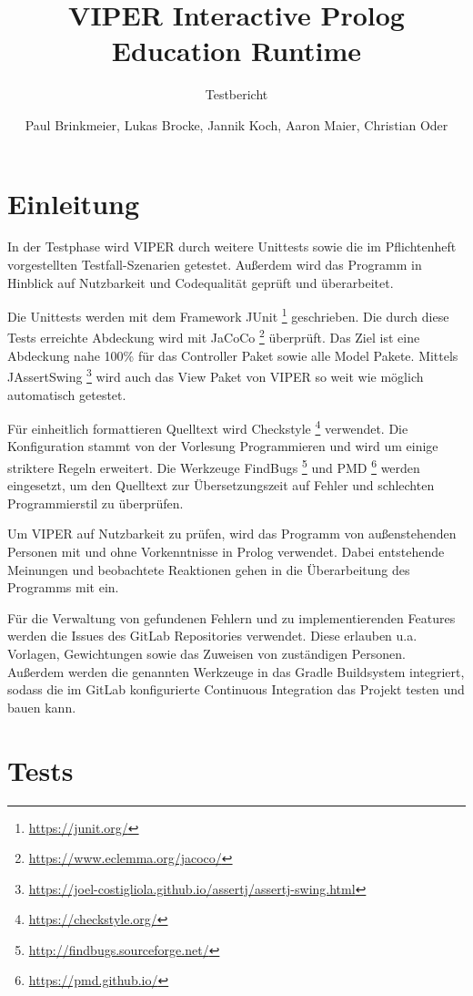 \documentclass[parskip=full,11pt,twoside]{scrartcl}
\title{VIPER Interactive Prolog Education Runtime}
\subtitle{Testbericht}
\author{Paul Brinkmeier, Lukas Brocke, Jannik Koch, Aaron Maier, Christian Oder}
\date{}
\begin{document}
\maketitle

\tableofcontents

\section{Einleitung}
\setcounter{page}{1}

In der Testphase wird VIPER durch weitere Unittests sowie die im Pflichtenheft vorgestellten Testfall-Szenarien getestet. Außerdem wird das Programm in Hinblick auf Nutzbarkeit und Codequalität geprüft und überarbeitet.

Die Unittests werden mit dem Framework JUnit \footnote{\url{https://junit.org/}} geschrieben. Die durch diese Tests erreichte Abdeckung wird mit JaCoCo \footnote{\url{https://www.eclemma.org/jacoco/}} überprüft. Das Ziel ist eine Abdeckung nahe 100\% für das Controller Paket sowie alle Model Pakete. Mittels JAssertSwing \footnote{\url{https://joel-costigliola.github.io/assertj/assertj-swing.html}} wird auch das View Paket von VIPER so weit wie möglich automatisch getestet.

Für einheitlich formattieren Quelltext wird Checkstyle \footnote{\url{https://checkstyle.org/}} verwendet. Die Konfiguration stammt von der Vorlesung Programmieren und wird um einige striktere Regeln erweitert. Die Werkzeuge FindBugs \footnote{\url{http://findbugs.sourceforge.net/}} und PMD \footnote{\url{https://pmd.github.io/}} werden eingesetzt, um den Quelltext zur Übersetzungszeit auf Fehler und schlechten Programmierstil zu überprüfen.

Um VIPER auf Nutzbarkeit zu prüfen, wird das Programm von außenstehenden Personen mit und ohne Vorkenntnisse in Prolog verwendet. Dabei entstehende Meinungen und beobachtete Reaktionen gehen in die Überarbeitung des Programms mit ein.

Für die Verwaltung von gefundenen Fehlern und zu implementierenden Features werden die Issues des GitLab Repositories verwendet. Diese erlauben u.a. Vorlagen, Gewichtungen sowie das Zuweisen von zuständigen Personen. Außerdem werden die genannten Werkzeuge in das Gradle Buildsystem integriert, sodass die im GitLab konfigurierte Continuous Integration das Projekt testen und bauen kann.

\section{Tests}
\end{document}
